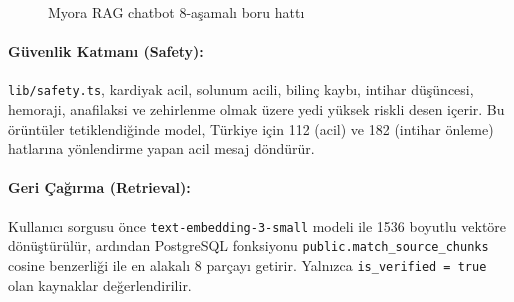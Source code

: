 \begin{figure}[H]
\centering
{}
\caption{Myora RAG chatbot 8-aşamalı boru hattı}
\label{fig:rag}
\end{figure}

\paragraph{Güvenlik Katmanı (Safety):}
\texttt{lib/safety.ts}, kardiyak acil, solunum acili, bilinç kaybı, intihar düşüncesi, hemoraji, anafilaksi ve zehirlenme olmak üzere yedi yüksek riskli desen içerir. Bu örüntüler tetiklendiğinde model, Türkiye için 112 (acil) ve 182 (intihar önleme) hatlarına yönlendirme yapan acil mesaj döndürür.

\paragraph{Geri Çağırma (Retrieval):}
Kullanıcı sorgusu önce \texttt{text-embedding-3-small} modeli ile 1536 boyutlu vektöre dönüştürülür, ardından PostgreSQL fonksiyonu \texttt{public.match\_source\_chunks} cosine benzerliği ile en alakalı 8 parçayı getirir. Yalnızca \texttt{is\_verified = true} olan kaynaklar değerlendirilir.

